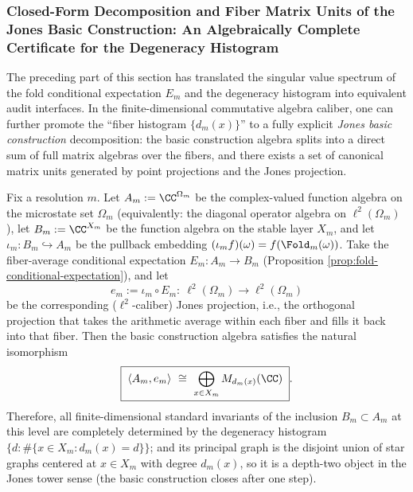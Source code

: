 \subsubsection{Closed-Form Decomposition and Fiber Matrix Units of the Jones Basic Construction: An Algebraically Complete Certificate for the Degeneracy Histogram}\label{subsubsec:op-algebra-fold-jones-basic-construction}
The preceding part of this section has translated the singular value spectrum of the fold conditional expectation \(E_m\) and the degeneracy histogram into equivalent audit interfaces.
In the finite-dimensional commutative algebra caliber, one can further promote the ``fiber histogram \(\{d_m(x)\}\)'' to a fully explicit \emph{Jones basic construction} decomposition:
the basic construction algebra splits into a direct sum of full matrix algebras over the fibers, and there exists a set of canonical matrix units generated by point projections and the Jones projection.

\begin{theorem}\label{thm:fold-jones-basic-construction-directsum}
Fix a resolution \(m\).
Let
\(
A_m:=\CC^{\Omega_m}
\)
be the complex-valued function algebra on the microstate set \(\Omega_m\) (equivalently: the diagonal operator algebra on \(\ell^2(\Omega_m)\)),
let
\(
B_m:=\CC^{X_m}
\)
be the function algebra on the stable layer \(X_m\), and let \(\iota_m:B_m\hookrightarrow A_m\) be the pullback embedding \((\iota_m f)(\omega)=f(\Fold_m(\omega))\).
Take the fiber-average conditional expectation \(E_m:A_m\to B_m\) (Proposition \ref{prop:fold-conditional-expectation}), and let
\[
e_m:=\iota_m\circ E_m:\ \ell^2(\Omega_m)\to \ell^2(\Omega_m)
\]
be the corresponding (\(\ell^2\)-caliber) Jones projection, i.e., the orthogonal projection that takes the arithmetic average within each fiber and fills it back into that fiber.
Then the basic construction algebra satisfies the natural isomorphism
\[
\boxed{\;
\langle A_m,e_m\rangle
\ \cong\
\bigoplus_{x\in X_m} M_{d_m(x)}(\CC)\; }.
\]
Therefore, all finite-dimensional standard invariants of the inclusion \(B_m\subset A_m\) at this level are completely determined by the degeneracy histogram
\(
\{d:\#\{x\in X_m:d_m(x)=d\}\}
\);
and its principal graph is the disjoint union of star graphs centered at \(x\in X_m\) with degree \(d_m(x)\), so it is a depth-two object in the Jones tower sense (the basic construction closes after one step).
\end{theorem}

